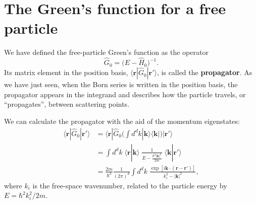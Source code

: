 \documentclass[pra,11pt]{revtex4}
\begin{document}
\section{The Green's function for a free particle}
  
We have defined the free-particle Green's function as the operator
$$\hat{G}_0=\big(E-\hat{H}_0\big)^{-1}.$$
Its matrix element in the position basis,
$\langle\mathbf{r}|\hat{G}_0|\mathbf{r}'\rangle$, is called the
\textbf{propagator}.  As we have just seen, when the Born series is
written in the position basis, the propagator appears in the integrand
and describes how the particle travels, or ``propagates'', between
scattering points.

We can calculate the propagator with the aid of the momentum
eigenstates:
$$\begin{aligned}\langle\mathbf{r}|\hat{G}_0|\mathbf{r}'\rangle &=
  \langle\mathbf{r}|\hat{G}_0 \Big(\int d^dk |\mathbf{k}\rangle\langle\mathbf{k}| \Big) |\mathbf{r}'\rangle \\ &= \int d^dk \; \langle\mathbf{r}|\mathbf{k}\rangle \; \frac{1}{E-\frac{\hbar^2|\mathbf{k}|^2}{2m}} \; \langle\mathbf{k}|\mathbf{r}'\rangle \\ &= \frac{2m}{\hbar^2} \frac{1}{(2\pi)^d} \int d^dk \; \frac{\exp\left[i\mathbf{k}\cdot (\mathbf{r}-\mathbf{r}')\right]}{k_i^2-|\mathbf{k}|^2},\end{aligned}$$
where $k_i$ is the free-space wavenumber, related to the
particle energy by $E = \hbar^2 k_i^2/2m$.
\end{document}
